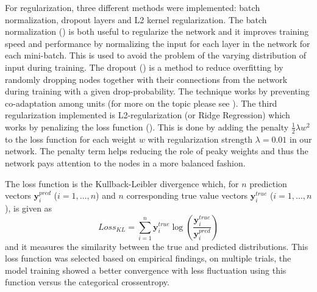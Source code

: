 \documentclass[12pt, a4paper]{article}
\begin{document}
For regularization, three different methods were implemented: batch normalization, dropout layers and L2 kernel regularization. The batch normalization (\cite{ioffe2015batch}) is both useful to regularize the network and it improves training speed and performance by normalizing the input for each layer in the network for each mini-batch. This is used to avoid the problem of the varying distribution of input during training. The dropout (\cite{srivastava2014dropout}) is a method to reduce overfitting by randomly dropping nodes together with their connections from the network during training with a given drop-probability. The technique works by preventing co-adaptation among units (for more on the topic please see \cite{hinton2012improving}). The third regularization implemented is L2-regularization (or Ridge Regression) which works by penalizing the loss function (\cite{ng2004feature}). This is done by adding the penalty $\frac{1}{2}\lambda w^2$ to the loss function for each weight $w$ with regularization strength $\lambda = 0.01$ in our network. The penalty term helps reducing the role of peaky weights and thus the network pays attention to the nodes in a more balanced fashion.

The loss function is the Kullback-Leibler divergence which, for $n$ prediction vectors $\mathbf{y}^{pred}_i$ ($i= 1, \dots, n$) and $n$ corresponding true value vectors $\mathbf{y}^{true}_i$ ($i= 1, \dots, n$), is given as
\begin{equation}
    \label{eq:KL}
    Loss_{KL} = \sum_{i=1}^{n}\mathbf{y}_i^{true} \log \left( \frac{\mathbf{y}_i^{true}}{\mathbf{y}_i^{pred}}\right)
\end{equation}
and it measures the similarity between the true and predicted distributions. This loss function was selected based on empirical findings, on multiple trials, the model training showed a better convergence with less fluctuation using this function versus the categorical crossentropy.
\end{document}
